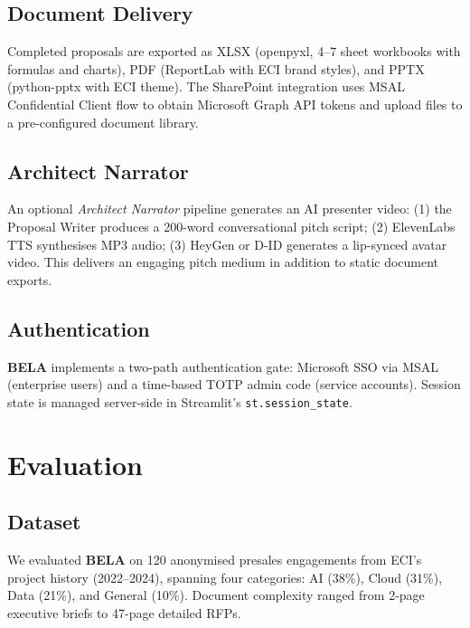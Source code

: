 \documentclass[10pt,twocolumn]{article}
\newcommand{\bela}{\textbf{BELA}}
\newcommand{\code}[1]{\texttt{\small #1}}
\begin{document}
\subsection{Document Delivery}

Completed proposals are exported as XLSX (openpyxl, 4–7 sheet workbooks with
formulas and charts), PDF (ReportLab with ECI brand styles), and PPTX
(python-pptx with ECI theme). The SharePoint integration uses MSAL
Confidential Client flow to obtain Microsoft Graph API tokens and upload
files to a pre-configured document library.

\subsection{Architect Narrator}

An optional \textit{Architect Narrator} pipeline generates an AI presenter video:
(1) the Proposal Writer produces a 200-word conversational pitch script;
(2) ElevenLabs TTS synthesises MP3 audio; (3) HeyGen or D-ID generates
a lip-synced avatar video. This delivers an engaging pitch medium in addition
to static document exports.

\subsection{Authentication}

\bela{} implements a two-path authentication gate: Microsoft SSO via MSAL
(enterprise users) and a time-based TOTP admin code (service accounts).
Session state is managed server-side in Streamlit's \code{st.session\_state}.

\section{Evaluation}
\label{sec:eval}

\subsection{Dataset}

We evaluated \bela{} on 120 anonymised presales engagements from ECI's
project history (2022–2024), spanning four categories: AI (38\%), Cloud (31\%),
Data (21\%), and General (10\%). Document complexity ranged from 2-page
executive briefs to 47-page detailed RFPs.
\end{document}
